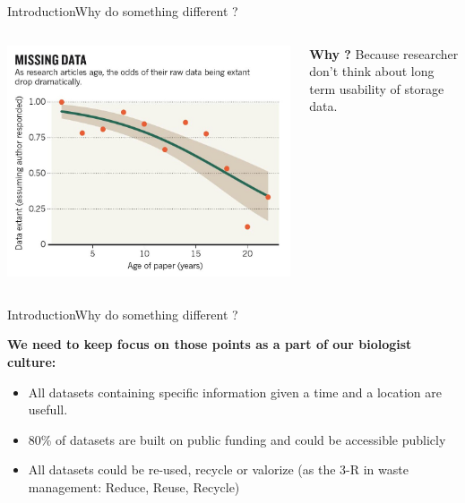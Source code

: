 \documentclass{eecslides}
\begin{document}
\begin{frame}{Introduction}{Why do something different ?}


\begin{columns}[c]
	\begin{column}{.50\paperwidth}
		\includegraphics[width=.50\paperwidth]{Nature_fig.jpg}
	\end{column}
	\begin{column}{.4\paperwidth}
		\textbf{Why ?} Because researcher don't think about long term usability of storage data.
	\end{column}
\end{columns}

\end{frame}


\begin{frame}{Introduction}{Why do something different ?}

\textbf{We need to keep focus on those points as a part of our biologist culture:}
	
	\begin{itemize}
		\item \alert{All datasets} containing specific information given a time and a location \alert{are usefull}.
		\item 80\% of datasets are built on \alert{public funding} \citep{Graham2013} and could be accessible publicly
		\item All datasets could be re-used, recycle or valorize (as the 3-R in waste management: Reduce, Reuse, Recycle) 
	\end{itemize}


\end{frame}
\end{document}
